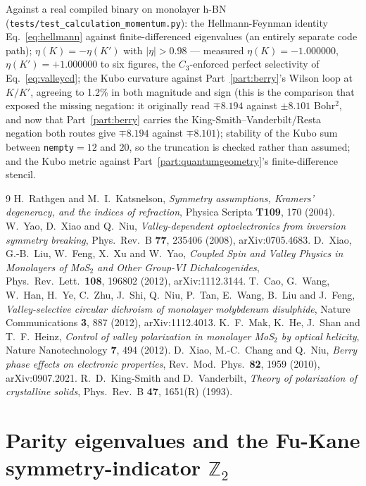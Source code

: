 \documentclass[11pt]{article}
\begin{document}
Against a real compiled binary on monolayer h-BN
(\texttt{tests/test\_calculation\_momentum.py}): the Hellmann-Feynman identity
Eq.~\eqref{eq:hellmann} against finite-differenced eigenvalues (an entirely separate code
path); $\eta(K)=-\eta(K')$ with $|\eta|>0.98$ --- measured $\eta(K)=-1.000000$,
$\eta(K')=+1.000000$ to six figures, the $C_3$-enforced perfect selectivity of
Eq.~\eqref{eq:valleycd}; the Kubo curvature against Part~\ref{part:berry}'s Wilson loop at
$K/K'$, agreeing to 1.2\% in both magnitude and sign (this is the comparison that
exposed the missing negation: it originally read $\mp8.194$ against $\pm8.101$
Bohr$^2$, and now that Part~\ref{part:berry} carries the
King-Smith--Vanderbilt/Resta negation both routes give $\mp8.194$ against $\mp8.101$);
stability of the Kubo sum between \texttt{nempty}$=12$ and
$20$, so the truncation is checked rather than assumed; and the Kubo metric against
Part~\ref{part:quantumgeometry}'s finite-difference stencil.

\begin{thebibliography}{9}
H.~Rathgen and M.~I.~Katsnelson,
\emph{Symmetry assumptions, Kramers' degeneracy, and the indices of refraction},
Physica Scripta \textbf{T109}, 170 (2004).
W.~Yao, D.~Xiao and Q.~Niu,
\emph{Valley-dependent optoelectronics from inversion symmetry breaking},
Phys.\ Rev.\ B \textbf{77}, 235406 (2008), arXiv:0705.4683.
D.~Xiao, G.-B.~Liu, W.~Feng, X.~Xu and W.~Yao,
\emph{Coupled Spin and Valley Physics in Monolayers of MoS$_2$ and Other Group-VI
Dichalcogenides},
Phys.\ Rev.\ Lett.\ \textbf{108}, 196802 (2012), arXiv:1112.3144.
T.~Cao, G.~Wang, W.~Han, H.~Ye, C.~Zhu, J.~Shi, Q.~Niu, P.~Tan, E.~Wang, B.~Liu and
J.~Feng,
\emph{Valley-selective circular dichroism of monolayer molybdenum disulphide},
Nature Communications \textbf{3}, 887 (2012), arXiv:1112.4013.
K.~F.~Mak, K.~He, J.~Shan and T.~F.~Heinz,
\emph{Control of valley polarization in monolayer MoS$_2$ by optical helicity},
Nature Nanotechnology \textbf{7}, 494 (2012).
D.~Xiao, M.-C.~Chang and Q.~Niu,
\emph{Berry phase effects on electronic properties},
Rev.\ Mod.\ Phys.\ \textbf{82}, 1959 (2010), arXiv:0907.2021.
R.~D.~King-Smith and D.~Vanderbilt,
\emph{Theory of polarization of crystalline solids},
Phys.\ Rev.\ B \textbf{47}, 1651(R) (1993).
\end{thebibliography}


\part{Parity eigenvalues and the Fu-Kane symmetry-indicator $\mathbb Z_2$}
\label{part:parity}
\end{document}
